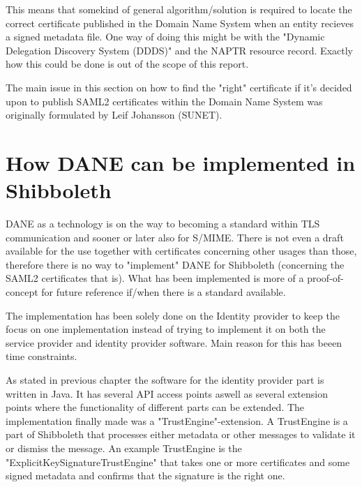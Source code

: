 This means that somekind of general algorithm/solution is required to locate the correct certificate published in the Domain Name System when an entity recieves a signed metadata file.
One way of doing this might be with the "Dynamic Delegation Discovery System (DDDS)"\cite{rfc:3401,rfc:3402,rfc:3403,rfc:3404} and the NAPTR resource record\cite{rfc:3403}.
Exactly how this could be done is out of the scope of this report.

The main issue in this section on how to find the "right" certificate if it's decided upon to publish SAML2 certificates within the Domain Name System was originally formulated by Leif Johansson (SUNET).

\section{How DANE can be implemented in Shibboleth} 
DANE as a technology is on the way to becoming a standard within TLS communication and sooner or later also for S/MIME.
There is not even a draft available for the use together with certificates concerning other usages than those, therefore there is no way to "implement" DANE for Shibboleth (concerning the SAML2 certificates that is).
What has been implemented is more of a proof-of-concept for future reference if/when there is a standard available.

The implementation has been solely done on the Identity provider to keep the focus on one implementation instead of trying to implement it on both the service provider and identity provider software.
Main reason for this has beeen time constraints.

As stated in previous chapter the software for the identity provider part is written in Java.
It has several API access points aswell as several extension points where the functionality of different parts can be extended.
The implementation finally made was a "TrustEngine"-extension.
A TrustEngine is a part of Shibboleth that processes either metadata or other messages to validate it or dismiss the message.
An example TrustEngine is the "ExplicitKeySignatureTrustEngine" that takes one or more certificates and some signed metadata and confirms that the signature is the right one. 



